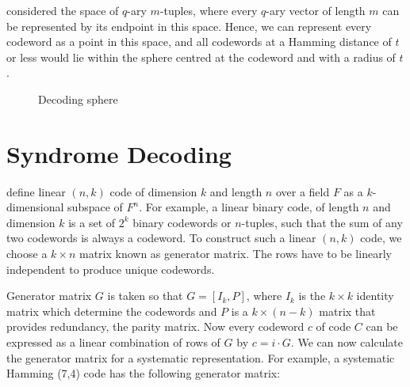 \documentclass[../main.tex]{subfiles}
\begin{document}
    \autocite{bose2008information} considered the space of $q$-ary $m$-tuples, where every $q$-ary vector of length $m$ can be represented by its endpoint in this space. Hence, we can represent every codeword as a point in this space, and all codewords at a Hamming distance of $t$ or less would lie within the sphere centred at the codeword and with a radius of $t$.

    \begin{figure}[h!tp]
        \centering
        \caption{Decoding sphere}
        \label{fig:decoding_sphere}
    \end{figure}


    \section{Syndrome Decoding} \label{sec:syndrome_decoding}
    \autocite{trappe2006introduction} define linear $(n,k)$ code of dimension $k$ and length $n$ over a field $F$ as a $k$-dimensional subspace of $F^n$. For example, a linear binary code, of length $n$ and dimension $k$ is a set of $2^k$ binary codewords or $n$-tuples, such that the sum of any two codewords is always a codeword. To construct such a linear $(n,k)$ code, we choose a $k \times n$ matrix known as generator matrix. The rows have to be linearly independent to produce unique codewords.

    Generator matrix $G$ is taken so that $G=[I_k,P]$, where $I_k$ is the $k \times k$ identity matrix which determine the codewords and $P$ is a $k \times (n-k)$ matrix that provides redundancy, the parity matrix. Now every codeword $c$ of code $C$ can be expressed as a linear combination of rows of $G$ by $c=i \cdot G$. We can now calculate the generator matrix for a systematic representation. For example, a systematic Hamming (7,4) code has the following generator matrix:
\end{document}
